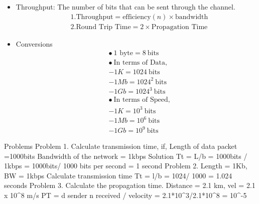\documentclass[12pt]{article}
\begin{document}
\begin{itemize}
  \item Throughput: The number of bits that can be sent through the channel. 
  \begin{align*}
  &1. \text{Throughput} = \text{efficiency}(n) \times \text{bandwidth} \\ 
  &2. \text{Round Trip Time} = 2 \times \text{Propagation Time}
  \end{align*}
  
   \item Conversions
  \begin{align*}
  &\bullet{} ~1 \text{ byte} = 8 ~\text{bits}\\
  &\bullet{} ~ \text{In terms of Data},\\
  &- 1K = 1024 ~\text{bits}\\
  &- 1Mb = 1024^2 ~\text{bits}\\
  &- 1Gb = 1024^3 ~ \text{bits}\\
  &\bullet{} ~ \text{In terms of Speed,}\\
  &- 1K = 10^3 ~ \text{bits}\\
  &- 1Mb = 10^6 ~ \text{bits}\\
  &- 1Gb = 10^9 ~ \text{bits}
  \end{align*}

\end{itemize}


\item \dfrac{\text{}}{\text{}}
Problems 
Problem 1.
Calculate transmission time, if, 
Length of data packet =1000bits
Bandwidth of the network = 1kbps
Solution
Tt = L/b = 1000bits / 1kbps = 1000bits/ 1000 bits per second = 1 second
Problem 2. 
Length = 1Kb, BW = 1kbps
Calculate transmission time
Tt = l/b = 1024/ 1000 = 1.024 seconds 
Problem 3. 
Calculate the propagation time.
Distance = 2.1 km, vel = 2.1 x 10^8 m/s 
PT = d sender n received / velocity  = 2.1*10^3/2.1*10^8  = 10^-5
\fi
\end{document}
